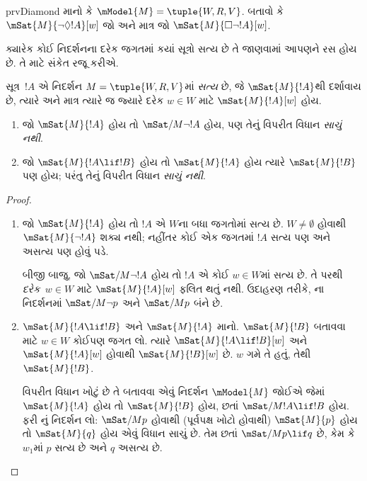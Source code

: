 \begin{probtag}{prvDiamond}
  માનો કે $\mModel{M} = \tuple{W, R, V}$. બતાવો કે
  $\mSat{M}{\lnot\Diamond !A}[w]$ જો અને માત્ર જો
  $\mSat{M}{\Box\lnot!A}[w]$.
\end{probtag}
\endgroup

\begingroup
\makeatletter{}\makeatother


\label{guunit:OLP-0414}


ક્યારેક કોઈ નિદર્શનના દરેક જગતમાં કયાં સૂત્રો સત્ય છે
તે જાણવામાં આપણને રસ હોય છે. તે માટે સંકેત રજૂ કરીએ.

\begin{defn}
  સૂત્ર~$!A$ એ નિદર્શન $M = \tuple{W, R,
    V}$માં \emph{સત્ય} છે, જે $\mSat{M}{!A}$થી દર્શાવાય છે,
  ત્યારે અને માત્ર ત્યારે જ જ્યારે દરેક $w \in W$ માટે
  $\mSat{M}{!A}[w]$ હોય.
\end{defn}

\begin{prop}
  \begin{enumerate}
  \item જો $\mSat{M}{!A}$ હોય તો $\mSat/{M}{\lnot !A}$ હોય,
    પણ તેનું વિપરીત વિધાન \emph{સાચું નથી}.
  \item જો $\mSat{M}{!A \lif !B}$ હોય તો $\mSat{M}{!A}$ હોય
    ત્યારે $\mSat{M}{!B}$ પણ હોય; પરંતુ તેનું વિપરીત વિધાન
    \emph{સાચું નથી}.
  \end{enumerate}
\end{prop}

\begin{proof}
  \begin{enumerate}
  \item જો $\mSat{M}{!A}$ હોય તો $!A$ એ $W$ના બધા જગતોમાં
    સત્ય છે. $W \neq \emptyset$ હોવાથી $\mSat{M}{\lnot!A}$
    શક્ય નથી; નહીંતર કોઈ એક જગતમાં $!A$ સત્ય પણ અને અસત્ય પણ
    હોવું પડે.

    બીજી બાજુ, જો $\mSat/{M}{\lnot !A}$ હોય તો $!A$ એ કોઈ
    $w \in W$માં સત્ય છે. તે પરથી \emph{દરેક}~$w \in W$ માટે
    $\mSat{M}{!A}[w]$ ફલિત થતું નથી. ઉદાહરણ તરીકે,
    ના નિદર્શનમાં $\mSat/{M}{\lnot p}$
    અને $\mSat/{M}{p}$ બંને છે.
  \item $\mSat{M}{!A \lif !B}$ અને $\mSat{M}{!A}$ માનો.
    $\mSat{M}{!B}$ બતાવવા માટે $w \in W$ કોઈપણ જગત લો.
    ત્યારે $\mSat{M}{!A \lif !B}[w]$ અને $\mSat{M}{!A}[w]$
    હોવાથી $\mSat{M}{!B}[w]$ છે. $w$ ગમે તે હતું, તેથી
    $\mSat{M}{!B}$.

    વિપરીત વિધાન ખોટું છે તે બતાવવા એવું નિદર્શન
    $\mModel{M}$ જોઈએ જેમાં $\mSat{M}{!A}$ હોય તો
    $\mSat{M}{!B}$ હોય, છતાં $\mSat/{M}{!A \lif !B}$ હોય.
    ફરી નું નિદર્શન લો:
    $\mSat/{M}{p}$ હોવાથી (પૂર્વપક્ષ ખોટો હોવાથી)
    $\mSat{M}{p}$ હોય તો $\mSat{M}{q}$ હોય એવું વિધાન સાચું છે.
    તેમ છતાં $\mSat/{M}{p \lif
      q}$ છે, કેમ કે~$w_1$માં $p$ સત્ય છે અને $q$ અસત્ય છે.
  \end{enumerate}
\end{proof}

